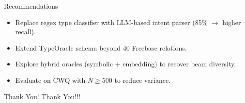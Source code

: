 \documentclass{beamer}
\begin{document}
\begin{frame}{Recommendations}
    \begin{itemize}
        \item Replace regex type classifier with LLM-based intent parser (85\% $\to$ higher recall).
        \vspace{0.3cm}
        \item Extend TypeOracle schema beyond 40 Freebase relations.
        \vspace{0.3cm}
        \item Explore hybrid oracles (symbolic + embedding) to recover beam diversity.
        \vspace{0.3cm}
        \item Evaluate on CWQ with $N \geq 500$ to reduce variance.
    \end{itemize}
\end{frame}

\begin{frame}{Thank You!}
    \centering \Huge Thank You!!!
\end{frame}
\end{document}
